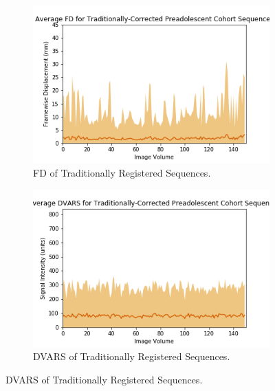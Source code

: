 \begin{figure}
	\begin{subfigure}{0.4\textwidth}
		\centering
		\includegraphics[width=1.0\textwidth]{6/figures/preads-trad-fd-150.png}
		\caption{FD of Traditionally Registered Sequences.}
	\end{subfigure}
	\hspace{0.05\textwidth}
	\begin{subfigure}{0.4\textwidth}
		\centering
		\includegraphics[width=1.0\textwidth]{6/figures/preads-trad-dvars-150.png}
		\caption{DVARS of Traditionally Registered Sequences.}
	\end{subfigure}
	

\end{figure}
